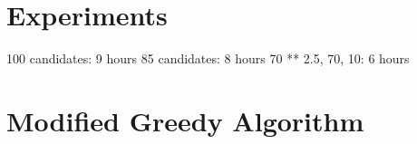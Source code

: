 \section{Experiments}
100 candidates: 9 hours
85 candidates: 8 hours
70 ** 2.5, 70, 10: 6 hours


\section{Modified Greedy Algorithm}